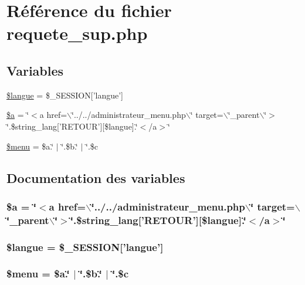 \hypertarget{requete__sup_8php}{
\section{R\'{e}f\'{e}rence du fichier requete\_\-sup.php}
\label{requete__sup_8php}
}
\subsection*{Variables}
\begin{CompactItemize}
\item 
\hyperlink{requete__sup_8php_a0}{\$langue} = \$\_\-SESSION\mbox{[}'langue'\mbox{]}
\item 
\hyperlink{requete__sup_8php_a1}{\$a} = \char`\"{}$<$a href=$\backslash$\char`\"{}../../administrateur\_\-menu.php$\backslash$\char`\"{} target=$\backslash$\char`\"{}\_\-parent$\backslash$\char`\"{}$>$\char`\"{}.\$string\_\-lang\mbox{[}'RETOUR'\mbox{]}\mbox{[}\$langue\mbox{]}.\char`\"{}$<$/a$>$\char`\"{}
\item 
\hyperlink{requete__sup_8php_a2}{\$menu} = \$a.\char`\"{} $|$ \char`\"{}.\$b.\char`\"{} $|$ \char`\"{}.\$c
\end{CompactItemize}


\subsection{Documentation des variables}
\hypertarget{requete__sup_8php_a1}{
\subsubsection[\$a]{\setlength{\rightskip}{0pt plus 5cm}\$a = \char`\"{}$<$a href=$\backslash$\char`\"{}../../administrateur\_\-menu.php$\backslash$\char`\"{} target=$\backslash$\char`\"{}\_\-parent$\backslash$\char`\"{}$>$\char`\"{}.\$string\_\-lang\mbox{[}'RETOUR'\mbox{]}\mbox{[}\$langue\mbox{]}.\char`\"{}$<$/a$>$\char`\"{}}}
\label{requete__sup_8php_a1}


\hypertarget{requete__sup_8php_a0}{
\subsubsection[\$langue]{\setlength{\rightskip}{0pt plus 5cm}\$langue = \$\_\-SESSION\mbox{[}'langue'\mbox{]}}}
\label{requete__sup_8php_a0}


\hypertarget{requete__sup_8php_a2}{
\subsubsection[\$menu]{\setlength{\rightskip}{0pt plus 5cm}\$menu = \$a.\char`\"{} $|$ \char`\"{}.\$b.\char`\"{} $|$ \char`\"{}.\$c}}
\label{requete__sup_8php_a2}


